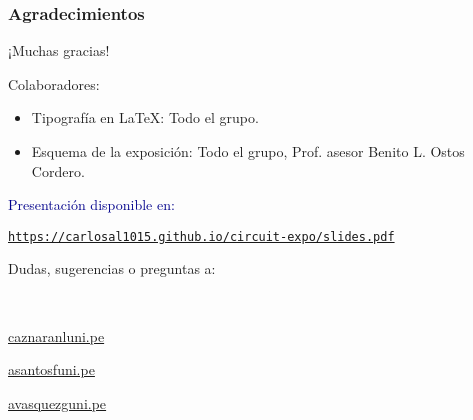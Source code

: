 \begin{frame}
	\frametitle{Agradecimientos}
	\begin{center}\Large
		¡Muchas gracias!
	\end{center}

	Colaboradores:

	\begin{itemize}
		\item Tipografía en \LaTeX{}: Todo el grupo.
		\item Esquema de la exposición: Todo el grupo, Prof. asesor Benito L. Ostos Cordero.
	\end{itemize}
	\vfill
	\begin{minipage}{0.45\paperwidth}
		\textcolor{DarkBlue}{Presentación disponible en:}
		\begin{center}
			\href{https://carlosal1015.github.io/circuit-expo/slides.pdf}{\texttt{https://carlosal1015.github.io/circuit-expo/slides.pdf}}
		\end{center}
	\end{minipage}
	\hfill
	\begin{minipage}{0.45\paperwidth}
		\begin{flushright}
			Dudas, sugerencias o preguntas a:

			\

			\href{mailto:caznaranl@uni.pe}{caznaranl\MVAt uni.pe}

			\href{mailto:asantosf@uni.pe}{asantosf\MVAt uni.pe}

			\href{mailto:avasquezg@uni.pe}{avasquezg\MVAt uni.pe}
		\end{flushright}
	\end{minipage}

\end{frame}

